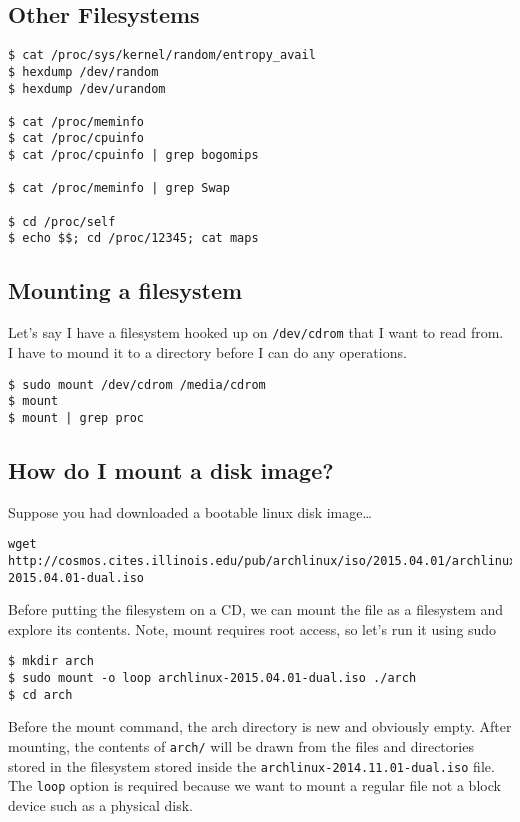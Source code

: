 \subsection{Other Filesystems}\label{other-filesystems}

\begin{verbatim}
$ cat /proc/sys/kernel/random/entropy_avail
$ hexdump /dev/random
$ hexdump /dev/urandom

$ cat /proc/meminfo
$ cat /proc/cpuinfo
$ cat /proc/cpuinfo | grep bogomips

$ cat /proc/meminfo | grep Swap

$ cd /proc/self
$ echo $$; cd /proc/12345; cat maps
\end{verbatim}

\subsection{Mounting a filesystem}\label{mounting-a-filesystem}

Let's say I have a filesystem hooked up on \texttt{/dev/cdrom} that I
want to read from. I have to mound it to a directory before I can do any
operations.

\begin{verbatim}
$ sudo mount /dev/cdrom /media/cdrom
$ mount
$ mount | grep proc
\end{verbatim}

\subsection{How do I mount a disk
image?}\label{how-do-i-mount-a-disk-image}

Suppose you had downloaded a bootable linux disk image\ldots{}

\begin{verbatim}
wget http://cosmos.cites.illinois.edu/pub/archlinux/iso/2015.04.01/archlinux-2015.04.01-dual.iso
\end{verbatim}

Before putting the filesystem on a CD, we can mount the file as a
filesystem and explore its contents. Note, mount requires root access,
so let's run it using sudo

\begin{verbatim}
$ mkdir arch
$ sudo mount -o loop archlinux-2015.04.01-dual.iso ./arch
$ cd arch
\end{verbatim}

Before the mount command, the arch directory is new and obviously empty.
After mounting, the contents of \texttt{arch/} will be drawn from the
files and directories stored in the filesystem stored inside the
\texttt{archlinux-2014.11.01-dual.iso} file. The \texttt{loop} option is
required because we want to mount a regular file not a block device such
as a physical disk.

